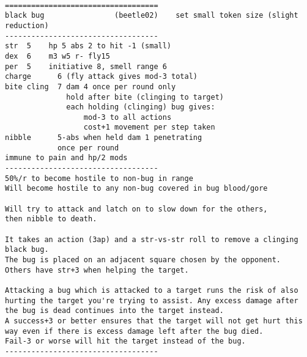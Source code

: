 \

\goodbreak \begin{samepage} \small \begin{verbatim}
===================================
black bug                (beetle02)    set small token size (slight reduction)
-----------------------------------
str  5    hp 5 abs 2 to hit -1 (small)
dex  6    m3 w5 r- fly15
per  5    initiative 8, smell range 6
charge      6 (fly attack gives mod-3 total)
bite cling  7 dam 4 once per round only
              hold after bite (clinging to target)
              each holding (clinging) bug gives:
                  mod-3 to all actions
                  cost+1 movement per step taken
nibble      5-abs when held dam 1 penetrating
            once per round
immune to pain and hp/2 mods
-----------------------------------
50%/r to become hostile to non-bug in range
Will become hostile to any non-bug covered in bug blood/gore

Will try to attack and latch on to slow down for the others,
then nibble to death.

It takes an action (3ap) and a str-vs-str roll to remove a clinging black bug.
The bug is placed on an adjacent square chosen by the opponent.
Others have str+3 when helping the target.

Attacking a bug which is attacked to a target runs the risk of also
hurting the target you're trying to assist. Any excess damage after
the bug is dead continues into the target instead.
A success+3 or better ensures that the target will not get hurt this
way even if there is excess damage left after the bug died.
Fail-3 or worse will hit the target instead of the bug.
-----------------------------------
\end{verbatim} \normalsize \end{samepage}

\

